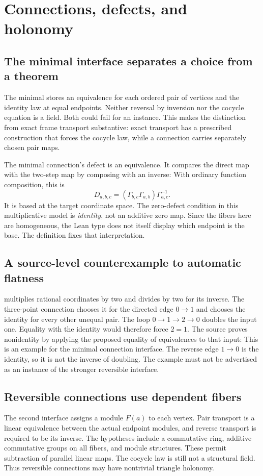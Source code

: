 \clearpage
\section{Connections, defects, and holonomy}
\subsection{The minimal interface separates a choice from a theorem}
The minimal  stores an equivalence for each ordered pair of vertices and the identity law at equal endpoints.
Neither reversal by inversion nor the cocycle equation is a field. Both could fail for an instance. This makes the distinction from exact frame transport substantive: exact transport has a prescribed construction that forces the cocycle law, while a connection carries separately chosen pair maps.

The minimal connection's defect is an equivalence. It compares the direct map with the two-step map by composing with an inverse:
With ordinary function composition, this is
\[
 D_{a,b,c}=(\Gamma_{b,c}\Gamma_{a,b})\Gamma_{a,c}^{-1}.
\]
It is based at the target coordinate space. The zero-defect condition in this multiplicative model is \emph{identity}, not an additive zero map. Since the fibers here are homogeneous, the Lean type does not itself display which endpoint is the base. The definition fixes that interpretation.

\subsection{A source-level counterexample to automatic flatness}
 multiplies rational coordinates by two and divides by two for its inverse. The three-point connection chooses it for the directed edge $0\to1$ and chooses the identity for every other unequal pair.
The loop $0\to1\to2\to0$ doubles the input one. Equality with the identity would therefore force $2=1$. The source proves nonidentity by applying the proposed equality of equivalences to that input:
This is an example for the minimal connection interface. The reverse edge $1\to0$ is the identity, so it is not the inverse of doubling. The example must not be advertised as an instance of the stronger reversible interface.

\subsection{Reversible connections use dependent fibers}
The second interface assigns a module $F(a)$ to each vertex. Pair transport is a linear equivalence between the actual endpoint modules, and reverse transport is required to be its inverse.
The hypotheses include a commutative ring, additive commutative groups on all fibers, and module structures. These permit subtraction of parallel linear maps. The cocycle law is still not a structural field. Thus reversible connections may have nontrivial triangle holonomy.

